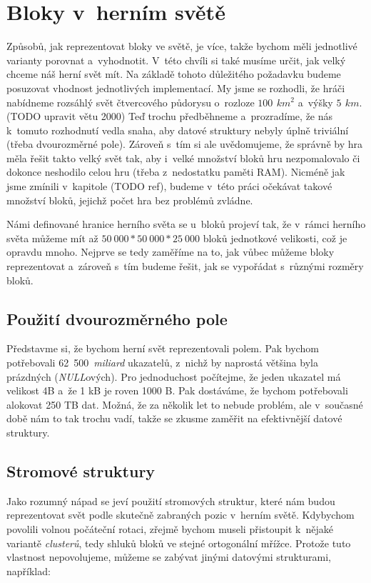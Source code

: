 \section{Bloky v~herním světě}
\label{sec:blocksWorld}

Způsobů, jak reprezentovat bloky ve světě, je více, takže bychom měli jednotlivé varianty porovnat a~vyhodnotit. V~této chvíli si také musíme určit, jak velký chceme náš herní svět mít. Na základě tohoto důležitého požadavku budeme posuzovat vhodnost jednotlivých implementací. My jsme se rozhodli, že hráči nabídneme rozsáhlý svět čtvercového půdorysu o~rozloze $100\,\ km^2$ a~výšky $5\,\ km$. (TODO upravit větu 2000) Teď trochu předběhneme a~prozradíme, že nás k~tomuto rozhodnutí vedla snaha, aby datové struktury nebyly úplně triviální (třeba dvourozměrné pole). Zároveň s~tím si ale uvědomujeme, že správně by hra měla řešit takto velký svět tak, aby i~velké množství bloků hru nezpomalovalo či dokonce neshodilo celou hru (třeba z~nedostatku paměti RAM). Nicméně jak jsme zmínili v~kapitole (TODO ref), budeme v~této práci očekávat takové množství bloků, jejichž počet hra bez problémů zvládne.

Námi definované hranice herního světa se u~bloků projeví tak, že v~rámci herního světa můžeme mít až $50~000 * 50~000 * 25~000$ bloků jednotkové velikosti, což je opravdu mnoho. Nejprve se tedy zaměříme na to, jak vůbec můžeme bloky reprezentovat a~zároveň s~tím budeme řešit, jak se vypořádat s~různými rozměry bloků.

\subsection{Použití dvourozměrného pole}

Představme si, že bychom herní svět reprezentovali polem. Pak bychom potřebovali 62~500~\textit{miliard} ukazatelů, z~nichž by naprostá většina byla prázdných (\textit{NULL}ových). Pro jednoduchost počítejme, že jeden ukazatel má velikost 4B a~že 1 kB je roven 1000 B. Pak dostáváme, že bychom potřebovali alokovat 250 TB dat. Možná, že za několik let to nebude problém, ale v~současné době nám to tak trochu vadí, takže se zkusme zaměřit na efektivnější datové struktury.

\subsection{Stromové struktury}
\label{subsec:trees}

Jako rozumný nápad se jeví použití stromových struktur, které nám budou reprezentovat svět podle skutečně zabraných pozic v~herním světě. Kdybychom povolili volnou počáteční rotaci, zřejmě bychom museli přistoupit k~nějaké variantě \textit{clusterů}, tedy shluků bloků ve stejné ortogonální mřížce. Protože tuto vlastnost nepovolujeme, můžeme se zabývat jinými datovými strukturami, například:

